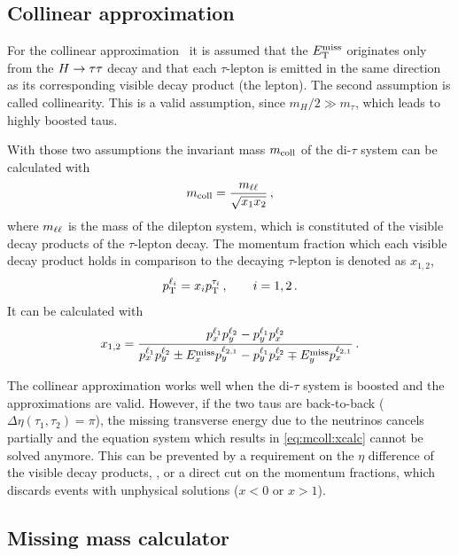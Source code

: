 \subsection{Collinear approximation}\label{sub:event_selection:mcoll}

For the collinear approximation~\cite{MCollAssumption,MColl} it is assumed that the $E_\text{T}^\text{miss}$ originates only
from the $H \to \tau \tau$ decay and that each $\tau$-lepton is emitted in the same direction as its corresponding visible decay
product (the lepton).
The second assumption is called collinearity.
This is a valid assumption, since $m_H / 2 \gg m_\tau$, which leads to highly boosted taus.

With those two assumptions the invariant mass $m_\text{coll}$ of the di-$\tau$ system can be calculated with
\begin{equation}
    \label{eq:mcoll}
    m_\text{coll} = \frac{m_{\ell\ell}}{\sqrt{x_1 x_2}} \,,
\end{equation}
where $m_{\ell\ell}$ is the mass of the dilepton system, which is constituted of the visible decay products of the
$\tau$-lepton decay.
The momentum fraction which each visible decay product holds in comparison to the decaying $\tau$-lepton
is denoted as $x_{1,2}$,
\begin{equation}
    \label{eq:mcoll:xdef}
    p_\text{T}^{\ell_i} = x_i p_\text{T}^{\tau_i} \,, \qquad i = 1,2 \,.
\end{equation}
It can be calculated with
\begin{equation}
    \label{eq:mcoll:xcalc}
    x_{1,2} = \frac{p_x^{\ell_1} p_y^{\ell_2} - p_y^{\ell_1} p_x^{\ell_2}}{p_x^{\ell_1} p_y^{\ell_2} \pm E_x^\text{miss} p_y^{\ell_{2,1}} - p_y^{\ell_1} p_x^{\ell_2} \mp E_y^\text{miss} p_x^{\ell_{2,1}}} \,.
\end{equation}

The collinear approximation works well when the di-$\tau$ system is boosted and the approximations are valid.
However, if the two taus are back-to-back ($\Delta \eta (\tau_1,\tau_2) = \pi$), the missing transverse energy
due to the neutrinos cancels partially and the equation system which results in \cref{eq:mcoll:xcalc} cannot
be solved anymore.
This can be prevented by a requirement on the $\eta$ difference of the visible decay products, \detall, or a direct
cut on the momentum fractions, which discards events with unphysical solutions ($x < 0$ or $x > 1$).

\subsection{Missing mass calculator}\label{sub:event_selection:mmc}


